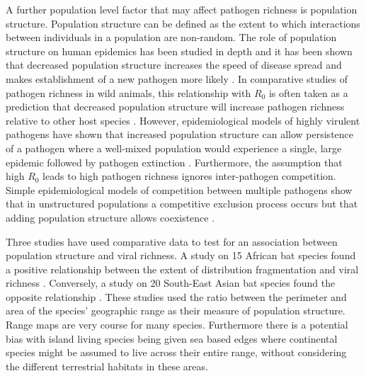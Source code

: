 A further population level factor that may affect pathogen richness is population structure.
Population structure can be defined as the extent to which interactions between individuals in a population are non-random.
The role of population structure on human epidemics has been studied in depth and it has been shown that decreased population structure increases the speed of disease spread and makes establishment of a new pathogen more likely \cite{colizza2007invasion, vespignani2008reaction}.
In comparative studies of pathogen richness in wild animals, this relationship with $R_0$ is often taken as a prediction that decreased population structure will increase pathogen richness relative to other host species \cite{nunn2003comparative, morand2000wormy, poulin2014parasite, poulin2000diversity, altizer2003social}. 
However, epidemiological models of highly virulent pathogens have shown that increased population structure can allow persistence of a pathogen where a well-mixed population would experience a single, large epidemic followed by pathogen extinction \cite{blackwood2013resolving, plowright2011urban}.
Furthermore, the assumption that high $R_0$ leads to high pathogen richness ignores inter-pathogen competition.
Simple epidemiological models of competition between multiple pathogens show that in unstructured populations a competitive exclusion process occurs but that adding population structure allows coexistence \cite{qiu2013vector, allen2004sis, nunes2006localized}.









Three studies have used comparative data to test for an association between population structure and viral richness.
A study on 15 African bat species found a positive relationship between the extent of distribution fragmentation and viral richness \cite{maganga2014bat}.
Conversely, a study on 20 South-East Asian bat species found the opposite relationship \cite{gay2014parasite}. 
These studies used the ratio between the perimeter and area of the species' geographic range as their measure of population structure.
Range maps are very course for many species.
Furthermore there is a potential bias with island living species being given sea based edges where continental species might be assumed to live across their entire range, without considering the different terrestrial habitats in these areas.

